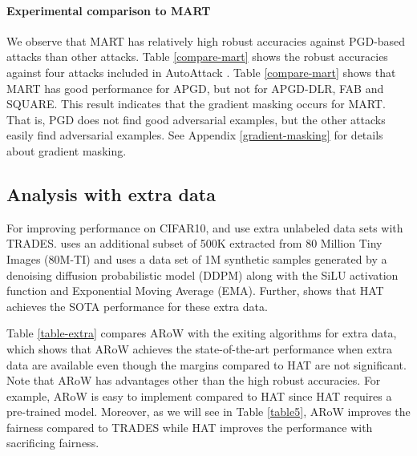 \documentclass[nohyperref]{article}
\theoremstyle{plain}
\theoremstyle{definition}
\theoremstyle{remark}
\begin{document}
\paragraph{Experimental comparison to MART}
We observe that MART has relatively high robust accuracies against PGD-based attacks than other attacks. Table \ref{compare-mart} shows the robust accuracies against four attacks included in AutoAttack \cite{croce2020reliable}.
Table \ref{compare-mart} shows that MART has good performance for APGD, but not for APGD-DLR, FAB and SQUARE. 
This result indicates that the gradient masking occurs for MART. That is,
PGD does not find good adversarial examples, but the other attacks easily find adversarial examples.
See Appendix \ref{gradient-masking} for details about gradient masking.


\subsection{Analysis with extra data}
\label{sec4_3}
For improving performance on CIFAR10, \cite{carmon2019unlabeled} and \cite{rebuffi2021data} use extra unlabeled data sets with TRADES. \cite{carmon2019unlabeled} uses an additional subset of 500K extracted from 80 Million Tiny Images (80M-TI) and \cite{rebuffi2021data} uses a data set of 1M synthetic samples generated by a denoising diffusion probabilistic model (DDPM) \citep{ho2020denoising} along with the SiLU activation function and Exponential Moving Average (EMA).
Further, \cite{rade2022reducing} shows that HAT achieves the SOTA performance for these extra data.

Table \ref{table-extra} compares ARoW with the exiting algorithms for extra data, which shows that ARoW achieves the state-of-the-art performance when extra data are available even though the margins compared to HAT
are not significant. 
Note that ARoW has advantages other than the high robust accuracies.
For example, ARoW
is easy to implement compared to HAT since HAT requires a pre-trained model.
Moreover, as we will see in Table \ref{table5}, ARoW improves the fairness compared to TRADES while HAT improves the performance with sacrificing fairness.
\end{document}

